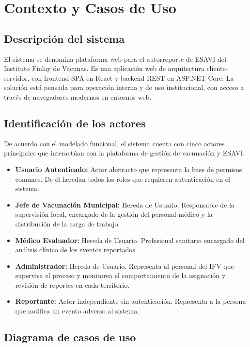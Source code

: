 \documentclass[12pt,letterpaper]{article}
\begin{document}
	


	\section{Contexto y Casos de Uso}

\subsection{Descripción del sistema}

El sistema se denomina plataforma web para el autorreporte de ESAVI del Instituto Finlay de Vacunas. Es una aplicación web de arquitectura cliente-servidor, con frontend SPA en React y backend REST en ASP.NET Core. La solución está pensada para operación interna y de uso institucional, con acceso a través de navegadores modernos en entornos web.

\subsection{Identificación de los actores}

De acuerdo con el modelado funcional, el sistema cuenta con cinco actores principales que interactúan con la plataforma de gestión de vacunación y ESAVI:

\begin{itemize}
\item \textbf{Usuario Autenticado:} Actor abstracto que representa la base de permisos comunes. De él heredan todos los roles que requieren autenticación en el sistema.
\item \textbf{Jefe de Vacunación Municipal:} Hereda de Usuario. Responsable de la supervisión local, encargado de la gestión del personal médico y la distribución de la carga de trabajo.
\item \textbf{Médico Evaluador:} Hereda de Usuario. Profesional sanitario encargado del análisis clínico de los eventos reportados.
\item \textbf{Administrador:} Hereda de Usuario. Representa al personal del IFV que supervisa el proceso y monitorea el comportamiento de la asignación y revisión de reportes en cada territorio.
\item \textbf{Reportante:} Actor independiente sin autenticación. Representa a la persona que notifica un evento adverso al sistema.
\end{itemize}

\subsection{Diagrama de casos de uso}
\end{document}
